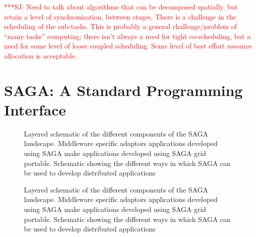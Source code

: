 \documentclass[conference,final]{IEEEtran}
\newcommand{\jhanote}[1]{ {\textcolor{red} { ***SJ: #1 }}}
\newcommand{\jhanote}[1]{}
\begin{document}
\jhanote{Need to talk about algorithms that can be decomposed
  spatially, but retain a level of synchronisation, between stages,
  There is a challenge in the scheduling of the sub-tasks.  This is
  probably a general challenge/problem of ``many tasks'' computing;
  there isn't always a need for tight co-scheduling, but a need for
  some level of loose coupled scheduling.  Some level of best effort
  resource allocation is acceptable.}

\section{SAGA: A Standard Programming Interface}


\begin{figure}[!h]
  \begin{center}
  \end{center}
  \caption{Layered schematic of the different components of the SAGA
    landscape.  Middleware specific adaptors applications developed
    using SAGA make applications developed using SAGA grid
    portable. Schematic showing the different ways in which SAGA can
    be used to develop distributed applications}
 \label{sagalayer}
\end{figure}


\begin{figure}[!h]
  \begin{center}
  \end{center}
  \caption{Layered schematic of the different components of the SAGA
    landscape.  Middleware specific adaptors applications developed
    using SAGA make applications developed using SAGA grid
    portable. Schematic showing the different ways in which SAGA can
    be used to develop distributed applications}
 \label{sagalayer}
\end{figure}
\end{document}

